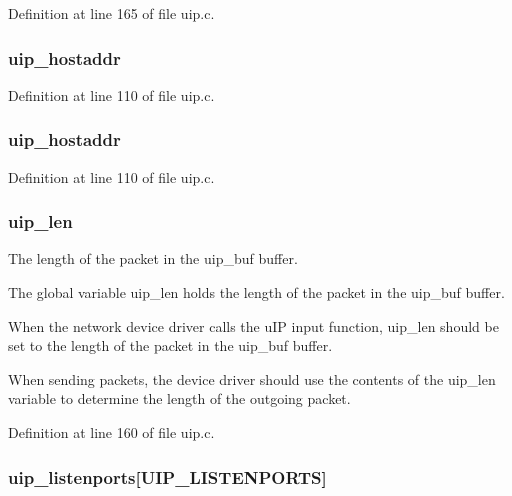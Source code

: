 Definition at line 165 of file uip.c.

\hypertarget{group__uip_ga7d3673f52f5846b6961d23b150decd54}{
\subsubsection[{uip\_\-hostaddr}]{ {\bf uip\_\-hostaddr}}}
\label{group__uip_ga7d3673f52f5846b6961d23b150decd54}


Definition at line 110 of file uip.c.

\hypertarget{group__uip_ga7d3673f52f5846b6961d23b150decd54}{
\subsubsection[{uip\_\-hostaddr}]{ {\bf uip\_\-hostaddr}}}
\label{group__uip_ga7d3673f52f5846b6961d23b150decd54}


Definition at line 110 of file uip.c.

\hypertarget{group__uip_ga12a33f0c09711167bdf3dd7d7cf8c5a1}{
\subsubsection[{uip\_\-len}]{ {\bf uip\_\-len}}}
\label{group__uip_ga12a33f0c09711167bdf3dd7d7cf8c5a1}
The length of the packet in the uip\_\-buf buffer.

The global variable uip\_\-len holds the length of the packet in the uip\_\-buf buffer.

When the network device driver calls the uIP input function, uip\_\-len should be set to the length of the packet in the uip\_\-buf buffer.

When sending packets, the device driver should use the contents of the uip\_\-len variable to determine the length of the outgoing packet. 

Definition at line 160 of file uip.c.

\hypertarget{group__uip_ga236d5c7872f59c8fe7b701c7252b976e}{
\subsubsection[{uip\_\-listenports}]{ {\bf uip\_\-listenports}\mbox{[}UIP\_\-LISTENPORTS\mbox{]}}}
\label{group__uip_ga236d5c7872f59c8fe7b701c7252b976e}


